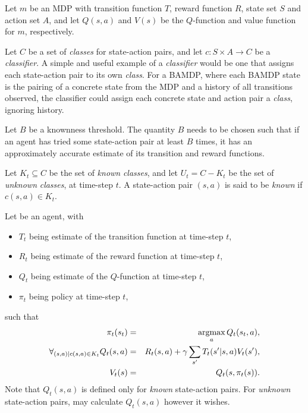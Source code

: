\begin{defn}
Let $m$ be an MDP with transition function $T$, reward function $R$, state set $S$ and action set $A$, and let $Q(s,a)$ and $V(s)$ be the $Q$-function and value function for $m$, respectively.
\end{defn}

\begin{defn}
Let $C$ be a set of \emph{classes} for state-action pairs, and let $c:S\times A\rightarrow C$ be a \emph{classifier}. A simple and useful example of a \emph{classifier} would be one that assigns each state-action pair to its own \emph{class}. For a BAMDP, where each BAMDP state is the pairing of a concrete state from the MDP and a history of all transitions observed, the classifier could assign each concrete state and action pair a \emph{class}, ignoring history.
\end{defn}

\begin{defn}
Let $B$ be a knownness threshold. The quantity $B$ needs to be chosen such that if an agent has tried some state-action pair at least $B$ times, it has an approximately accurate estimate of its transition and reward functions.
\end{defn}

\begin{defn}
Let $K_t \subseteq C$ be the set of \emph{known} \emph{classes}, and let $U_t = C - K_t$ be the set of \emph{unknown} \emph{classes}, at time-step $t$. A state-action pair $(s,a)$ is said to be \emph{known} if $c(s,a) \in K_t$.
\end{defn}

\begin{defn}
Let \A be an agent, with
\begin{itemize}
\item
$T_t$ being \As estimate of the transition function at time-step $t$,
\item
$R_t$ being \As estimate of the reward function at time-step $t$,
\item
$Q_t$ being \As estimate of the $Q$-function at time-step $t$,
\item
$\pi_t$ being \As policy at time-step $t$, 
\end{itemize}
such that
\begin{eqnarray}
\pi_t(s_t) &=& \argmax_a Q_t(s_t,a),\\
\forall_{(s,a) | c(s,a)\in K_t} Q_t(s,a) &=& R_t(s,a) + \gamma \sum_{s'} T_t(s'|s,a) V_t(s'),\\
V_t(s) &=& Q_t(s,\pi_t(s)).
\end{eqnarray}
Note that $Q_t(s,a)$ is defined only for \emph{known} state-action pairs. For \emph{unknown} state-action pairs, \A may calculate $Q_t(s,a)$ however it wishes.
\end{defn}

